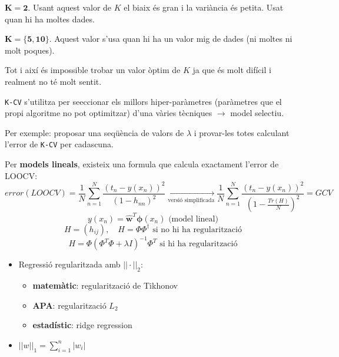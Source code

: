 \documentclass[a4paper]{article}
\begin{document}
$\boldsymbol{K=2}$. Usant aquest valor de $K$ el biaix és gran i la variància és petita. Usat quan hi ha moltes dades.

$\boldsymbol{K=\{5,10\}}$. Aquest valor s'usa quan hi ha un valor mig de dades (ni moltes ni molt poques).

Tot i així és impossible trobar un valor òptim de $K$ ja que és molt difícil i realment no té molt sentit.

\verb|K-CV| s'utilitza per se\lgem eccionar els millors hiper-paràmetres (paràmetres que el propi algoritme no pot optimitzar) d'una vàries tècniques $\rightarrow$ model selectiu.

Per exemple: proposar una seqüència de valors de $\lambda$ i provar-les totes calculant l'error de \verb|K-CV| per cadascuna.

Per \textbf{models lineals}, existeix una formula que calcula exactament l'error de LOOCV:
$$
error(LOOCV) = \frac{1}{N} \sum_{n=1}^N \frac{\left(t_n - y(x_n)\right)^2}{(1 - h_{nn})^2} \underset{\text{versió simplificada}}{\longrightarrow}
\frac{1}{N} \sum_{n=1}^N \frac{(t_n - y(x_n))^2}{\left(1 - \frac{Tr(H)}{N}\right)^2} = GCV
$$
$$
y(x_n) = \hat{\boldsymbol{w}}^T \boldsymbol{\phi} (x_n) \text{ (model lineal)}
$$
$$
H = (h_{ij}), \quad H = \Phi \Phi^{\dag} \text{ si no hi ha regularització}
$$
$$
H = \Phi \left( \Phi^T \Phi + \lambda I \right)^{-1} \Phi^T \text{ si hi ha regularització}
$$

\begin{itemize}
	\item Regressió regularitzada amb $||·||_2$:
	\begin{itemize}
		\item \textbf{matemàtic}: regularització de Tikhonov
		\item \textbf{APA}: regularització $L_2$
		\item \textbf{estadístic}: ridge regression
	\end{itemize}
	\item $||w||_1 = \sum_{i=1}^n |w_i|$
	
\end{itemize}
\end{document}
